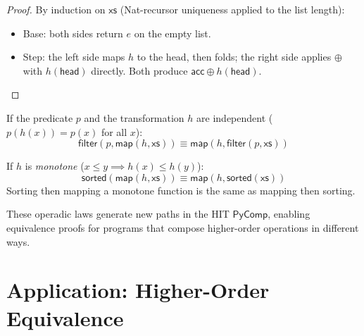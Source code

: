 \begin{proof}
By induction on $\mathsf{xs}$ (Nat-recursor uniqueness applied to
the list length):
\begin{itemize}
  \item Base: both sides return $e$ on the empty list.
  \item Step: the left side maps $h$ to the head, then folds; the
    right side applies $\oplus$ with $h(\mathsf{head})$ directly.
    Both produce $\mathsf{acc} \oplus h(\mathsf{head})$.
\end{itemize}
\end{proof}

\begin{theorem}
\label{thm:filter-map}
If the predicate $p$ and the transformation $h$ are independent
($p(h(x)) = p(x)$ for all $x$):
\[
  \mathsf{filter}(p, \mathsf{map}(h, \mathsf{xs}))
  \equiv
  \mathsf{map}(h, \mathsf{filter}(p, \mathsf{xs}))
\]
\end{theorem}

\begin{theorem}
\label{thm:sorted-map}
If $h$ is \emph{monotone} ($x \leq y \implies h(x) \leq h(y)$):
\[
  \mathsf{sorted}(\mathsf{map}(h, \mathsf{xs}))
  \equiv
  \mathsf{map}(h, \mathsf{sorted}(\mathsf{xs}))
\]
Sorting then mapping a monotone function is the same as mapping
then sorting.
\end{theorem}

These operadic laws generate new paths in the HIT $\mathsf{PyComp}$,
enabling equivalence proofs for programs that compose higher-order
operations in different ways.

\section{Application: Higher-Order Equivalence}

